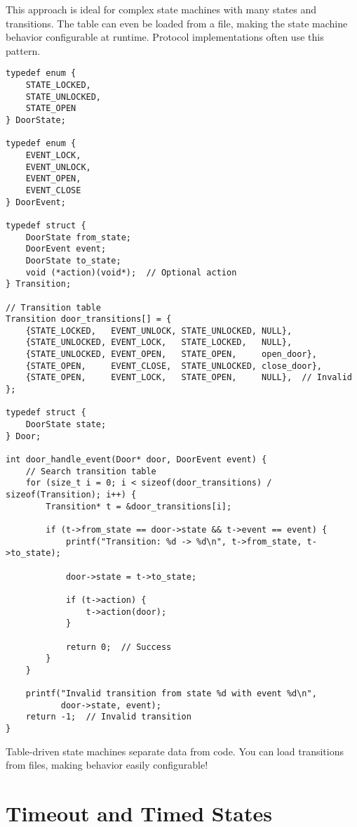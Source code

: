 This approach is ideal for complex state machines with many states and transitions. The table can even be loaded from a file, making the state machine behavior configurable at runtime. Protocol implementations often use this pattern.

\begin{lstlisting}
typedef enum {
    STATE_LOCKED,
    STATE_UNLOCKED,
    STATE_OPEN
} DoorState;

typedef enum {
    EVENT_LOCK,
    EVENT_UNLOCK,
    EVENT_OPEN,
    EVENT_CLOSE
} DoorEvent;

typedef struct {
    DoorState from_state;
    DoorEvent event;
    DoorState to_state;
    void (*action)(void*);  // Optional action
} Transition;

// Transition table
Transition door_transitions[] = {
    {STATE_LOCKED,   EVENT_UNLOCK, STATE_UNLOCKED, NULL},
    {STATE_UNLOCKED, EVENT_LOCK,   STATE_LOCKED,   NULL},
    {STATE_UNLOCKED, EVENT_OPEN,   STATE_OPEN,     open_door},
    {STATE_OPEN,     EVENT_CLOSE,  STATE_UNLOCKED, close_door},
    {STATE_OPEN,     EVENT_LOCK,   STATE_OPEN,     NULL},  // Invalid
};

typedef struct {
    DoorState state;
} Door;

int door_handle_event(Door* door, DoorEvent event) {
    // Search transition table
    for (size_t i = 0; i < sizeof(door_transitions) / sizeof(Transition); i++) {
        Transition* t = &door_transitions[i];

        if (t->from_state == door->state && t->event == event) {
            printf("Transition: %d -> %d\n", t->from_state, t->to_state);

            door->state = t->to_state;

            if (t->action) {
                t->action(door);
            }

            return 0;  // Success
        }
    }

    printf("Invalid transition from state %d with event %d\n",
           door->state, event);
    return -1;  // Invalid transition
}
\end{lstlisting}

\begin{tipbox}
Table-driven state machines separate data from code. You can load transitions from files, making behavior easily configurable!
\end{tipbox}

\section{Timeout and Timed States}

